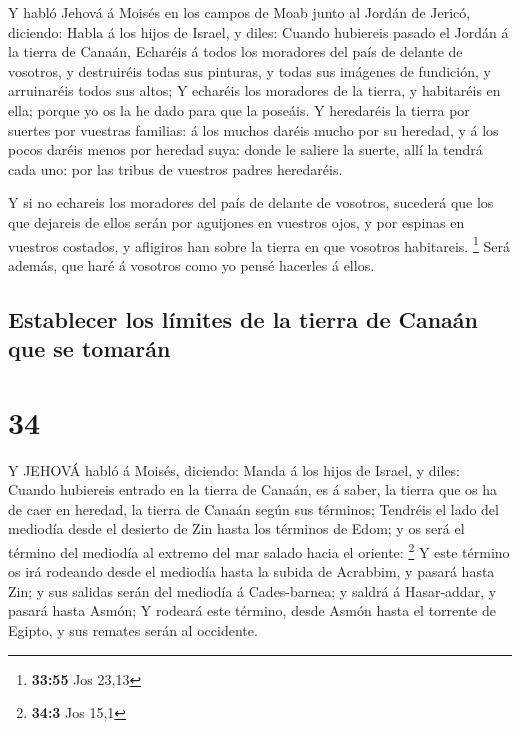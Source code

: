  Y habló Jehová á Moisés en los campos de Moab junto al
Jordán de Jericó, diciendo:  Habla á los hijos de Israel, y
diles: Cuando hubiereis pasado el Jordán á la tierra de Canaán,
 Echaréis á todos los moradores del país de delante de
vosotros, y destruiréis todas sus pinturas, y todas sus imágenes de
fundición, y arruinaréis todos sus altos;  Y echaréis los
moradores de la tierra, y habitaréis en ella; porque yo os la he dado
para que la poseáis.  Y heredaréis la tierra por suertes
por vuestras familias: á los muchos daréis mucho por su heredad, y á los
pocos daréis menos por heredad suya: donde le saliere la suerte, allí la
tendrá cada uno: por las tribus de vuestros padres heredaréis.

 Y si no echareis los moradores del país de delante de
vosotros, sucederá que los que dejareis de ellos serán por aguijones en
vuestros ojos, y por espinas en vuestros costados, y afligiros han sobre
la tierra en que vosotros habitareis. \footnote{\textbf{33:55} Jos 23,13}
 Será además, que haré á vosotros como yo pensé hacerles á
ellos.

\hypertarget{establecer-los-luxedmites-de-la-tierra-de-canauxe1n-que-se-tomaruxe1n}{%
\subsection{Establecer los límites de la tierra de Canaán que se
tomarán}\label{establecer-los-luxedmites-de-la-tierra-de-canauxe1n-que-se-tomaruxe1n}}

\hypertarget{section-33}{%
\section{34}\label{section-33}}

 Y JEHOVÁ habló á Moisés, diciendo:  Manda á los
hijos de Israel, y diles: Cuando hubiereis entrado en la tierra de
Canaán, es á saber, la tierra que os ha de caer en heredad, la tierra de
Canaán según sus términos;  Tendréis el lado del mediodía
desde el desierto de Zin hasta los términos de Edom; y os será el
término del mediodía al extremo del mar salado hacia el oriente:
\footnote{\textbf{34:3} Jos 15,1}  Y este término os irá
rodeando desde el mediodía hasta la subida de Acrabbim, y pasará hasta
Zin; y sus salidas serán del mediodía á Cades-barnea; y saldrá á
Hasar-addar, y pasará hasta Asmón;  Y rodeará este término,
desde Asmón hasta el torrente de Egipto, y sus remates serán al
occidente.

